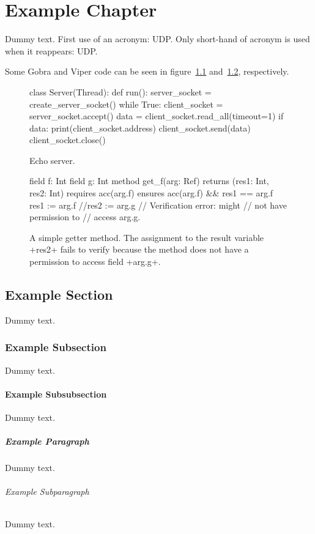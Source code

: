 \chapter{Example Chapter}

Dummy text. First use of an acronym: \ac{UDP}. Only short-hand of acronym is used when it reappears: \ac{UDP}.

Some Gobra and Viper code can be seen in figure~\ref{lst:echoServer} and~\ref{lst:silver_fields}, respectively.

\begin{figure}
  \begin{gobra}
    class Server(Thread):
      def run():
        server_socket = create_server_socket()
        while True:
          client_socket = server_socket.accept()
          data = client_socket.read_all(timeout=1)
          if data:
            print(client_socket.address)
            client_socket.send(data)
          client_socket.close()
  \end{gobra}
  \caption{Echo server.}
  \label{lst:echoServer}
\end{figure}

\begin{figure}
    \begin{myViper}
      field f: Int
      field g: Int
      method get_f(arg: Ref) returns (res1: Int,
                                      res2: Int)
        requires acc(arg.f)
        ensures acc(arg.f) && res1 == arg.f
      {
        res1 := arg.f
      //res2 := arg.g   // Verification error: might
                        // not have permission to
                        // access arg.g.
      }
    \end{myViper}
    \caption{A simple getter method. The assignment to the result
        variable \vl+res2+ fails to verify because the method does
        not have a permission to access field \vl+arg.g+.}
    \label{lst:silver_fields}
\end{figure}


\section{Example Section}

Dummy text.

\subsection{Example Subsection}

Dummy text.

\subsubsection{Example Subsubsection}

Dummy text.

\paragraph{Example Paragraph}

Dummy text.

\subparagraph{Example Subparagraph}

Dummy text. 
